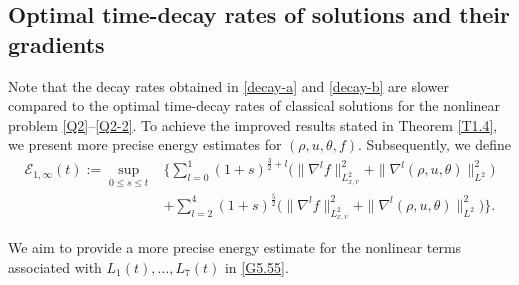\documentclass[reqno,11pt]{amsart}
\theoremstyle{plain}
\numberwithin{equation}{section}
\begin{document}
\subsection{Optimal time-decay rates of  solutions and their gradients }
Note that the decay rates obtained in \eqref{decay-a} and \eqref{decay-b} are 
slower compared to the optimal time-decay rates of classical solutions for the nonlinear problem \eqref{Q2}--\eqref{Q2-2}. To achieve the improved results stated in Theorem \ref{T1.4}, we present more precise energy estimates for $(\rho, u, \theta, f)$. Subsequently, we define  
\begin{align}\label{G5.69}  
\mathcal{E}_{1,\infty}(t) := \sup_{0 \leq s \leq t} & \bigg\{ \sum_{l=0}^1 (1+s)^{\frac{3}{2}+l} \big( \| \nabla^l f \|_{L_{x,v}^2}^2 + \| \nabla^l (\rho, u,\theta) \|_{L^2}^2 \big) \nonumber \\  
& + \sum_{l=2}^4(1+s)^{\frac{5}{2}} \big( \| \nabla^l f \|_{L_{x,v}^2}^2 + \| \nabla^l (\rho, u,\theta) \|_{L^2}^2 \big) \bigg\}.  
\end{align}  


We aim to provide a more precise energy estimate for the nonlinear terms associated with $ L_1(t),\dots,L_7(t) $ in \eqref{G5.55}.
\end{document}
